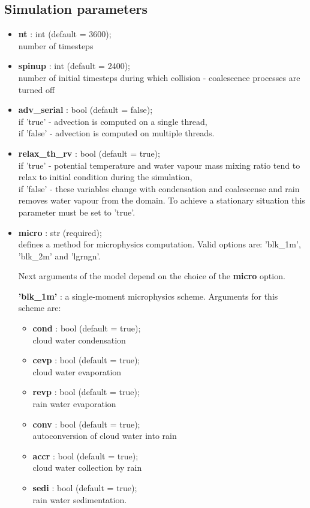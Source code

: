 \documentclass[11pt]{article}
\begin{document}
\subsection{Simulation parameters}

\begin{itemize}
\item \textbf{nt} : int (default = 3600);\\ number of timesteps
\item \textbf{spinup} : int (default = 2400);\\ number of initial timesteps during which collision - coalescence processes are turned off
\item \textbf{adv\_serial} : bool (default = false);\\ if 'true' - advection is computed on a single thread, \\if 'false' - advection is computed on multiple threads. 
\item \textbf{relax\_th\_rv} : bool (default = true);\\ if 'true' - potential temperature and water vapour mass mixing ratio tend to relax to initial condition during the simulation, \\ if 'false' - these variables change with condensation and coalescense and rain removes water vapour from the domain. To achieve a stationary situation this parameter must be set to 'true'.
\item \textbf{micro} : str (required);\\ defines a method for microphysics computation. Valid options are: 'blk\_1m', 'blk\_2m' and 'lgrngn'.
 
Next arguments of the model depend on the choice of the \textbf{micro} option.

\textbf{'blk\_1m'} : a single-moment microphysics scheme. Arguments for this scheme are: 
\begin{itemize}[label=$\bullet$]
\item \textbf{cond} : bool (default = true); \\ cloud water condensation
\item \textbf{cevp} : bool (default = true); \\ cloud water evaporation
\item \textbf{revp} : bool (default = true); \\ rain water evaporation
\item \textbf{conv} : bool (default = true); \\ autoconversion of cloud water into rain
\item \textbf{accr} : bool (default = true); \\ cloud water collection by rain
\item \textbf{sedi} : bool (default = true); \\ rain water sedimentation.
\end{itemize}



\end{itemize}
\end{document}
